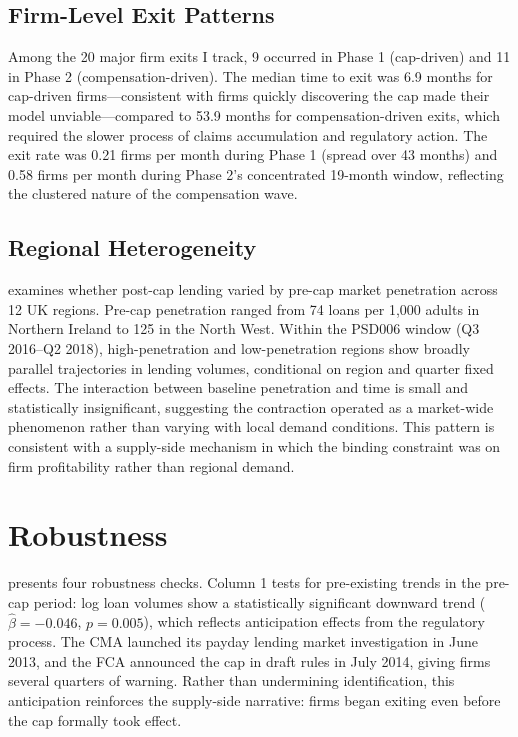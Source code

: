 \documentclass[12pt]{article}
\begin{document}


\subsection{Firm-Level Exit Patterns}

Among the 20 major firm exits I track, 9 occurred in Phase 1 (cap-driven) and 11 in Phase 2 (compensation-driven). The median time to exit was 6.9 months for cap-driven firms---consistent with firms quickly discovering the cap made their model unviable---compared to 53.9 months for compensation-driven exits, which required the slower process of claims accumulation and regulatory action. The exit rate was 0.21 firms per month during Phase 1 (spread over 43 months) and 0.58 firms per month during Phase 2's concentrated 19-month window, reflecting the clustered nature of the compensation wave.

\subsection{Regional Heterogeneity}

 examines whether post-cap lending varied by pre-cap market penetration across 12 UK regions. Pre-cap penetration ranged from 74 loans per 1,000 adults in Northern Ireland to 125 in the North West. Within the PSD006 window (Q3 2016--Q2 2018), high-penetration and low-penetration regions show broadly parallel trajectories in lending volumes, conditional on region and quarter fixed effects. The interaction between baseline penetration and time is small and statistically insignificant, suggesting the contraction operated as a market-wide phenomenon rather than varying with local demand conditions. This pattern is consistent with a supply-side mechanism in which the binding constraint was on firm profitability rather than regional demand.



\section{Robustness}

 presents four robustness checks. Column 1 tests for pre-existing trends in the pre-cap period: log loan volumes show a statistically significant downward trend ($\hat{\beta} = -0.046$, $p = 0.005$), which reflects anticipation effects from the regulatory process. The CMA launched its payday lending market investigation in June 2013, and the FCA announced the cap in draft rules in July 2014, giving firms several quarters of warning. Rather than undermining identification, this anticipation reinforces the supply-side narrative: firms began exiting even before the cap formally took effect.
\end{document}
